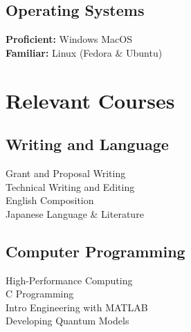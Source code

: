 \documentclass[letterpaper]{deedy-resume} %
\begin{document}
\begin{minipage}[t]{0.32\textwidth}
\sectionspace


\sectionspace

\subsection{Operating Systems}
\sectionspace
\textbf{Proficient:}		Windows \textbullet{} MacOS\\
\textbf{Familiar:}	Linux (Fedora \& Ubuntu)
\sectionspace
\section{Relevant Courses}

\subsection{Writing and Language}
\sectionspace
\textbullet{}Grant and Proposal Writing\\
\textbullet{}Technical Writing and Editing\\
\textbullet{}English Composition\\
\textbullet{}Japanese Language \& Literature

\sectionspace

\subsection{Computer Programming}
\sectionspace
\textbullet{}High-Performance Computing\\
\textbullet{}C Programming\\
\textbullet{}Intro Engineering with MATLAB\\
\textbullet{}Developing Quantum Models


\end{minipage}
\end{document}
